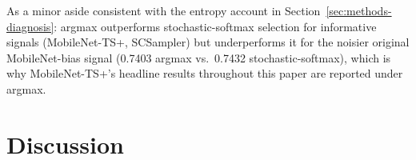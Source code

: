 \documentclass[preprint,12pt]{elsarticle}
\begin{document}
As a minor aside consistent with the entropy account in Section~\ref{sec:methods-diagnosis}: argmax outperforms stochastic-softmax selection for informative signals (MobileNet-TS+, SCSampler) but underperforms it for the noisier original MobileNet-bias signal (0.7403 argmax vs.\ 0.7432 stochastic-softmax), which is why MobileNet-TS+'s headline results throughout this paper are reported under argmax.

\section{Discussion}
\label{sec:discussion}
\end{document}
